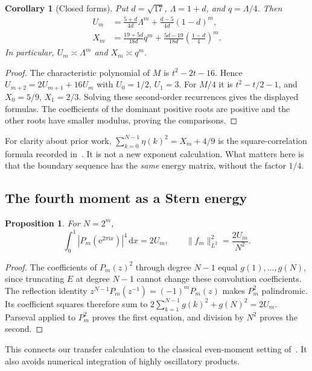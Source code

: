 \documentclass[11pt,a4paper]{article}
\numberwithin{equation}{section}
\newtheorem{proposition}[theorem]{Proposition}
\newtheorem{corollary}[theorem]{Corollary}
\theoremstyle{definition}
\theoremstyle{remark}
\newcommand{\dd}{\,\mathrm d}
\newcommand{\ee}{\mathrm e}
\newcommand{\ii}{\mathrm i}
\newcommand{\norm}[1]{\lVert #1\rVert}
\begin{document}
\begin{corollary}[Closed forms]
\label{cor:energy-closed}
Put $d=\sqrt{17}$, $\Lambda=1+d$, and $q=\Lambda/4$. Then
\begin{align}
 U_m&=\frac{5+d}{4d}\Lambda^m
      +\frac{d-5}{4d}(1-d)^m,\label{eq:U-closed}\\
 X_m&=\frac{19+5d}{18d}q^m
      +\frac{5d-19}{18d}\left(\frac{1-d}{4}\right)^m.
 \label{eq:X-closed}
\end{align}
In particular, $U_m\asymp\Lambda^m$ and $X_m\asymp q^m$.
\end{corollary}
\begin{proof}
The characteristic polynomial of $M$ is $t^2-2t-16$. Hence
$U_{m+2}=2U_{m+1}+16U_m$ with $U_0=1/2$, $U_1=3$.
For $M/4$ it is $t^2-t/2-1$, and $X_0=5/9$, $X_1=2/3$.
Solving these second-order recurrences gives the displayed formulas. The
coefficients of the dominant positive roots are positive and the other roots
have smaller modulus, proving the comparisons.
\end{proof}

For clarity about prior work, $\sum_{k=0}^{N-1}\eta(k)^2=X_m+4/9$ is the
square-correlation formula recorded in~\cite{CMPS}. It is not a new exponent
calculation. What matters here is that the boundary sequence has the \emph{same}
energy matrix, without the factor $1/4$.

\subsection{The fourth moment as a Stern energy}
\begin{proposition}
\label{prop:fourth}
For $N=2^m$,
\begin{equation}
 \int_0^1|P_m(\ee^{2\pi\ii x})|^4\dd x=2U_m,
 \qquad \norm{f_m}_{L^2}^2=\frac{2U_m}{N^2}.
 \label{eq:fourth}
\end{equation}
\end{proposition}
\begin{proof}
The coefficients of $P_m(z)^2$ through degree $N-1$ equal
$g(1),\ldots,g(N)$, since truncating $E$ at degree $N-1$ cannot change these
convolution coefficients. The reflection identity
$z^{N-1}P_m(z^{-1})=(-1)^mP_m(z)$ makes $P_m^2$ palindromic. Its coefficient
squares therefore sum to
$2\sum_{k=1}^{N-1}g(k)^2+g(N)^2=2U_m$. Parseval applied to $P_m^2$ proves the
first equation, and division by $N^2$ proves the second.
\end{proof}

This connects our transfer calculation to the classical even-moment setting
of~\cite{MMR}. It also avoids numerical integration of highly oscillatory products.
\end{document}
